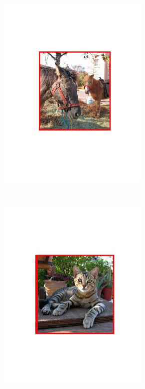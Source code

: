 \begin{figure}[hbt]
    \begin{subfigure}[b]{0.37\textwidth}
        \centering
        \includegraphics[width=0.8\textwidth]{FP3}
        \caption{}
        \label{fig:detfp3}
    \end{subfigure}
    ~
    \begin{subfigure}[b]{0.37\textwidth}
        \centering
        \includegraphics[width=0.8\textwidth]{FP4}

\end{subfigure}
\end{figure}
